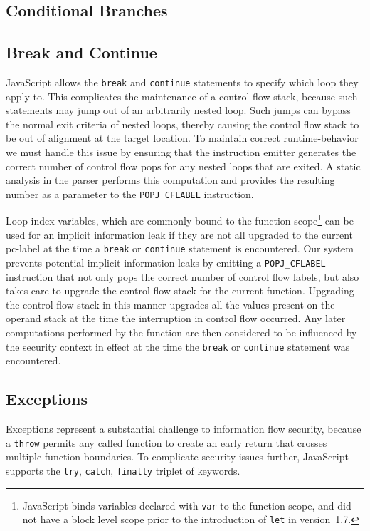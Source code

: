 \subsection{Conditional Branches}
\subsection{Break and Continue}
\label{sec:break-and-continue}
JavaScript allows the \texttt{break} and \texttt{continue} statements to specify which loop they apply to.
This complicates the maintenance of a control flow stack, because such statements may jump out of an arbitrarily nested loop.
Such jumps can bypass the normal exit criteria of nested loops, thereby causing the control flow stack to be out of alignment at the target location.
To maintain correct runtime-behavior we must handle this issue by ensuring that the instruction emitter generates the correct number of control flow pops for any nested loops that are exited.
A static analysis in the parser performs this computation and provides the resulting number as a parameter to the \texttt{POPJ\_CFLABEL} instruction.

Loop index variables, which are commonly bound to the function scope\footnote{JavaScript binds variables declared with \texttt{var} to the function scope, and did not have a block level scope prior to the introduction of \texttt{let} in version~1.7.} can be used for an implicit information leak if they are not all upgraded to the current pc-label at the time a \texttt{break} or \texttt{continue} statement is encountered.
Our system prevents potential implicit information leaks by emitting a \texttt{POPJ\_CFLABEL} instruction that not only pops the correct number of control flow labels, but also takes care to upgrade the control flow stack for the current function.
Upgrading the control flow stack in this manner upgrades all the values present on the operand stack at the time the interruption in control flow occurred.
Any later computations performed by the function are then considered to be influenced by the security context in effect at the time the \texttt{break} or \texttt{continue} statement was encountered.

\subsection{Exceptions}
\label{sec:exceptions}
Exceptions represent a substantial challenge to information flow security, because a \texttt{throw} permits any called function to create an early return that crosses multiple function boundaries.
To complicate security issues further, JavaScript supports the \texttt{try}, \texttt{catch}, \texttt{finally} triplet of keywords.

